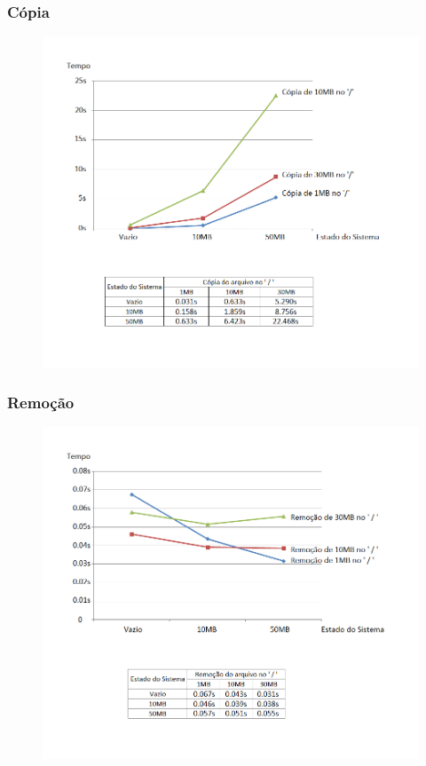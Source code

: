 \documentclass{beamer}
\begin{document}
\begin{frame}
\frametitle{Cópia} 
\begin{figure}
\centering
\includegraphics[scale=0.45]{vazio1MBpng.png}
\end{figure}
\justifying

\end{frame}


\begin{frame}
\frametitle{Remoção} 
\begin{figure}
\centering
\includegraphics[scale=0.45]{remocaopng.png}
\end{figure}
\justifying
\end{frame}
\end{document}
